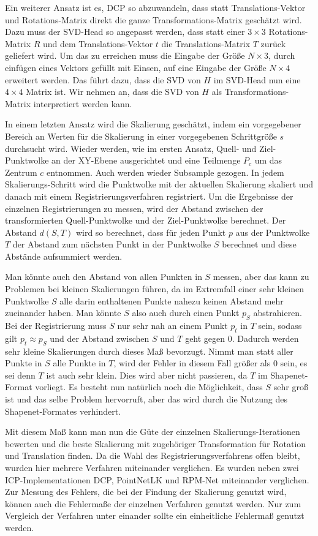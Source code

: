 \documentclass[12pt,titlepage, twoside]{article}
\begin{document}
Ein weiterer Ansatz ist es, DCP so abzuwandeln, dass statt Translations-Vektor und Rotations-Matrix direkt die ganze Transformations-Matrix geschätzt wird. 
Dazu muss der SVD-Head so angepasst werden, dass statt einer $3\times 3$ Rotations-Matrix $R$ und dem Translations-Vektor $t$ die Translations-Matrix $T$ zurück geliefert wird.
Um das zu erreichen muss die Eingabe der Größe $N\times 3$, durch einfügen eines Vektors gefüllt mit Einsen, auf eine Eingabe der Größe $N\times 4$ erweitert werden. 
Das führt dazu, dass die SVD von $H$ im SVD-Head nun eine $4\times 4$ Matrix ist. 
Wir nehmen an, dass die SVD von $H$ als Transformations-Matrix interpretiert werden kann.

In einem letzten Ansatz wird die Skalierung geschätzt, indem ein vorgegebener Bereich an Werten für die Skalierung in einer vorgegebenen Schrittgröße $s$ durchsucht wird.
Wieder werden, wie im ersten Ansatz, Quell- und Ziel-Punktwolke an der XY-Ebene ausgerichtet und eine Teilmenge $P_c$ um das Zentrum $c$ entnommen. Auch werden wieder Subsample gezogen.
In jedem Skalierungs-Schritt wird die Punktwolke mit der aktuellen Skalierung skaliert und danach mit einem Registrierungsverfahren registriert.
Um die Ergebnisse der einzelnen Registrierungen zu messen, wird der Abstand zwischen der transformierten Quell-Punktwolke und der Ziel-Punktwolke berechnet. 
Der Abstand $d(S,T)$ wird so berechnet, dass für jeden Punkt $p$ aus der Punktwolke $T$ der Abstand zum nächsten Punkt in der Punktwolke $S$ berechnet und diese Abstände aufsummiert werden.

Man könnte auch den Abstand von allen Punkten in $S$ messen, aber das kann zu Problemen bei kleinen Skalierungen führen, 
da im Extremfall einer sehr kleinen Punktwolke $S$ alle darin enthaltenen Punkte nahezu keinen Abstand mehr zueinander haben.
Man könnte $S$ also auch durch einen Punkt $p_{S}$ abstrahieren.
Bei der Registrierung muss $S$ nur sehr nah an einem Punkt $p_t$ in $T$ sein, sodass gilt $p_t \approx p_S$ und der Abstand zwischen $S$ und $T$ geht gegen $0$. 
Dadurch werden sehr kleine Skalierungen durch dieses Maß bevorzugt.
Nimmt man statt aller Punkte in $S$ alle Punkte in $T$, wird der Fehler in diesem Fall größer als $0$ sein, es sei denn $T$ ist auch sehr klein.
Dies wird aber nicht passieren, da $T$ im Shapenet-Format vorliegt.
Es besteht nun natürlich noch die Möglichkeit, dass $S$ sehr groß ist und das selbe Problem hervorruft, aber das wird durch die Nutzung des Shapenet-Formates verhindert.

Mit diesem Maß kann man nun die Güte der einzelnen Skalierungs-Iterationen bewerten und die beste Skalierung mit zugehöriger Transformation für Rotation und Translation finden.
Da die Wahl des Registrierungsverfahrens offen bleibt, wurden hier mehrere Verfahren miteinander verglichen. Es wurden neben zwei ICP-Implementationen DCP, PointNetLK und RPM-Net miteinander verglichen.
Zur Messung des Fehlers, die bei der Findung der Skalierung genutzt wird, können auch die Fehlermaße der einzelnen Verfahren genutzt werden. 
Nur zum Vergleich der Verfahren unter einander sollte ein einheitliche Fehlermaß genutzt werden.
\end{document}
